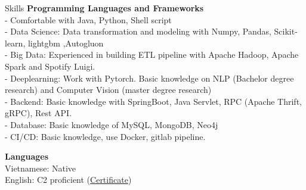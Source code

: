 \documentclass{resume} %
\begin{document}
\begin{rSection}{Skills}
{\bf Programming Languages and Frameworks }
\\ - Comfortable with Java, Python, Shell script
\\ - Data Science: Data transformation and modeling with Numpy, Pandas, Scikit-learn, lightgbm ,Autogluon
\\ - Big Data: Experienced in building ETL pipeline with Apache Hadoop, Apache Spark and Spotify Luigi.
\\ - Deeplearning: Work with Pytorch. Basic knowledge on NLP (Bachelor degree research) and Computer Vision (master degree research)
\\ - Backend: Basic knowledge with SpringBoot, Java Servlet, RPC (Apache Thrift, gRPC), Rest API. 
\\ - Database: Basic knowledge of MySQL, MongoDB, Neo4j
\\ - CI/CD: Basic knowledge, use Docker, gitlab pipeline.

{\bf Languages}
\\Vietnamese: Native
\\English: C2 proficient (\href{https://www.efset.org/cert/o5HAWP}{Certificate})
\end{rSection}




\end{document}
